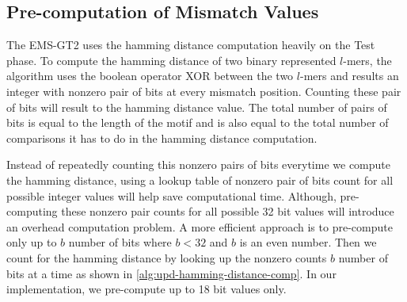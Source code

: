

\subsection{Pre-computation of Mismatch Values}
The EMS-GT2 uses the hamming distance computation heavily on the Test phase. To compute the hamming distance of two binary represented $l$-mers, the algorithm uses the boolean operator XOR between the two $l$-mers and results an integer with nonzero pair of bits at every mismatch position. Counting these pair of bits will result to the hamming distance value. The total number of pairs of bits is equal to the length of the motif and is also equal to the total number of comparisons it has to do in the hamming distance computation. 

Instead of repeatedly counting this nonzero pairs of bits everytime we compute the hamming distance, using a lookup table of nonzero pair of bits count for all possible integer values will help save computational time. Although, pre-computing these nonzero pair counts for all possible 32 bit values will introduce an overhead computation problem. A more efficient approach is to pre-compute only up to $b$ number of bits where $b < 32$ and $b$ is an even number. Then we count for the hamming distance by looking up the nonzero counts $b$ number of bits at a time as shown in \ref{alg:upd-hamming-distance-comp}. In our implementation, we pre-compute up to 18 bit values only.

 









